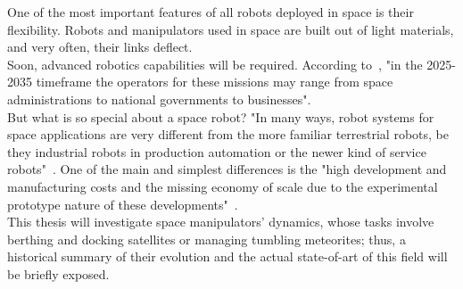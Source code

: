 \documentclass[a4paper,12pt,oneside]{report}
\begin{document}
One of the most important features of all robots deployed in space is their flexibility. Robots and manipulators used in space are built out of light materials, and very often, their links deflect.\\
Soon, advanced robotics capabilities will be required. According to~\cite{three}, "in the 2025-2035 timeframe the operators for these missions may range from space administrations to national governments to businesses".\\
But what is so special about a space robot? "In many ways, robot systems for space applications are very different from the more familiar terrestrial robots, be they industrial robots in production automation or the newer kind of service robots"~\cite{one}. One of the main and simplest differences is the "high development and manufacturing costs and the missing economy of scale due to the experimental prototype nature of these developments"~\cite{one}.\\
This thesis will investigate space manipulators' dynamics, whose tasks involve berthing and docking satellites or managing tumbling meteorites; thus, a historical summary of their evolution and the actual state-of-art of this field will be briefly exposed.
\newpage
\end{document}
